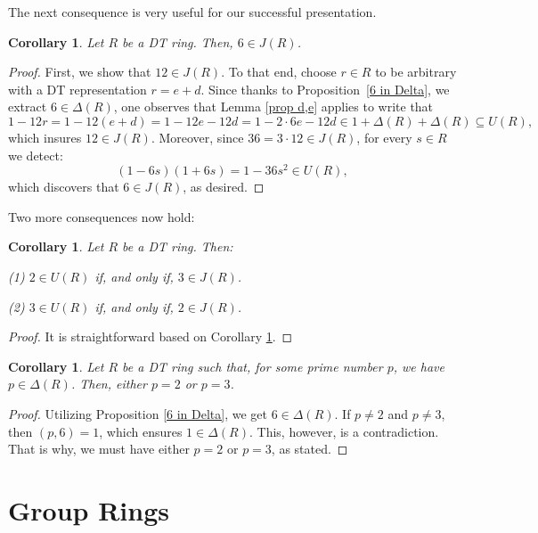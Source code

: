 \documentclass[12pt]{amsart}
\newtheorem{corollary}[theorem]{Corollary}
\theoremstyle{definition}
\begin{document}
The next consequence is very useful for our successful presentation.

\begin{corollary}\label{6 in Jacobson}
Let $R$ be a DT ring. Then, $6 \in J(R)$.
\end{corollary}

\begin{proof}
First, we show that $12 \in J(R)$. To that end, choose $r \in R$ to be arbitrary with a DT representation $r = e + d$. Since thanks to Proposition~\ref{6 in Delta}, we extract $6 \in \Delta(R)$, one observes that Lemma \ref{prop d,e} applies to write that
\[
1 - 12r = 1 - 12(e + d) = 1 - 12e - 12d = 1 - 2 \cdot 6e - 12d \in 1 + \Delta(R) + \Delta(R) \subseteq U(R),
\]
which insures $12 \in J(R)$. Moreover, since $36 = 3 \cdot 12 \in J(R)$, for every $s \in R$ we detect:
\[
(1 - 6s)(1 + 6s) = 1 - 36s^2 \in U(R),
\]
which discovers that $6 \in J(R)$, as desired.
\end{proof}

Two more consequences now hold:

\begin{corollary}\label{2 in U(R) iff 3 in J(R)}
Let $R$ be a DT ring. Then:

(1) $2 \in U(R)$ if, and only if, $3 \in J(R)$.

(2) $3 \in U(R)$ if, and only if, $2 \in J(R)$.
\end{corollary}

\begin{proof}
It is straightforward based on Corollary \ref{6 in Jacobson}.
\end{proof}

\begin{corollary}\label{p and Delta p=2 or 3}
Let $R$ be a DT ring such that, for some prime number $p$, we have $p \in \Delta(R)$. Then, either $p=2$ or $p=3$.
\end{corollary}

\begin{proof}
Utilizing Proposition \ref{6 in Delta}, we get $6 \in \Delta(R)$. If $p \neq 2$ and $p \neq 3$, then $(p,6)=1$, which ensures $1 \in \Delta(R)$. This, however, is a contradiction. That is why, we must have either $p=2$ or $p=3$, as stated.
\end{proof}

\section{Group Rings}
\end{document}
